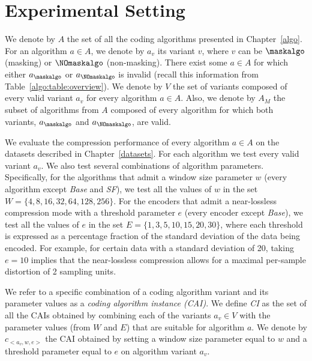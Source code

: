 
\clearpage
\section{Experimental Setting}
\label{experiments:experiments}


We denote by $A$ the set of all the coding algorithms presented in Chapter~\ref{algo}. For an algorithm $a \in A$, we denote by $a_v$ its variant $v$, where $v$ can be $\maskalgo$ (masking) or $\NOmaskalgo$ (non-masking). There exist some $a \in A$ for which either $a_\maskalgo$ or $a_\NOmaskalgo$ is invalid (recall this information from Table~\ref{algo:table:overview}). We denote by $V$ the set of variants composed of every valid variant $a_v$ for every algorithm $a \in A$. Also, we denote by $A_M$ the subset of algorithms from $A$ composed of every algorithm for which both variants, $a_\maskalgo$ and $a_\NOmaskalgo$, are valid.


We evaluate the compression performance of every algorithm $a \in A$ on the datasets described in Chapter~\ref{datasets}. For each algorithm we test every valid variant $a_v$. We also test several combinations of algorithm parameters. Specifically, for the algorithms that admit a window size parameter $w$ (every algorithm except \textit{Base} and \textit{SF}), we test all the values of $w$ in the set $W = \{4, 8, 16, 32, 64, 128, 256\}$. For the encoders that admit a near-lossless compression mode with a threshold parameter $e$ (every encoder except \textit{Base}), we test all the values of $e$ in the set $E= \{1, 3, 5, 10, 15, 20, 30\}$, where each threshold is expressed as a percentage fraction of the standard deviation of the data being encoded. For example, for certain data with a standard deviation of 20, taking $e=10$ implies that the near-lossless compression allows for a maximal per-sample distortion of 2 sampling units.


\vspace{+5pt}
\begin{defcion}
We refer to a specific combination of a coding algorithm variant and its parameter values as a \textit{coding algorithm instance (CAI)}. We define \textit{CI} as the set of all the CAIs obtained by combining each of the variants $a_v \in V$ with the parameter values (from $W$ and $E$) that are suitable for algorithm $a$. We denote by $c_{<a_v, w, e>}$ the CAI obtained by setting a window size parameter equal to $w$ and a threshold parameter equal to $e$ on algorithm variant $a_v$.
\end{defcion}


